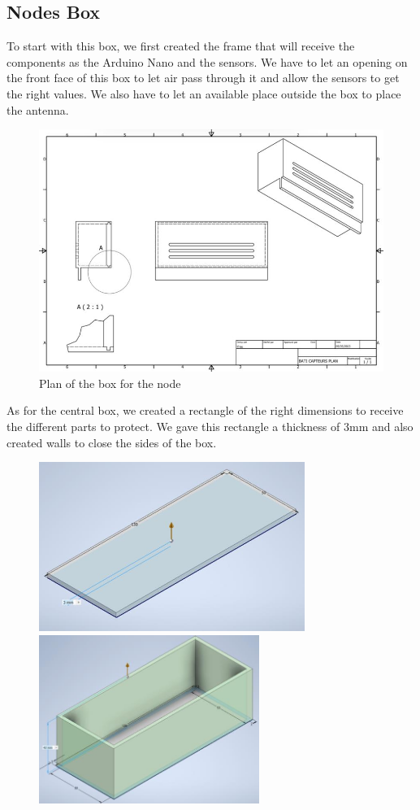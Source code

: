 \subsection{Nodes Box}
To start with this box, we first created the frame that will receive the components as the Arduino Nano and the sensors. We have to let an opening on the front face of this box to let air pass through it and allow the sensors to get the right values. We also have to let an available place outside the box to place the antenna.
\begin{figure}[H]
    \centering
    \includegraphics[width=.8\textwidth]{images/casing/img36.jpg}
    \caption{Plan of the box for the node}
\end{figure}

As for the central box, we created a rectangle of the right dimensions to receive the different parts to protect. We gave this rectangle a thickness of 3mm and also created walls to close the sides of the box.
\begin{figure}[H]
    \includegraphics[height=5.5cm]{images/casing/img37.jpg}
    \hfill
    \includegraphics[height=5.5cm]{images/casing/img38.jpg}
\end{figure}

